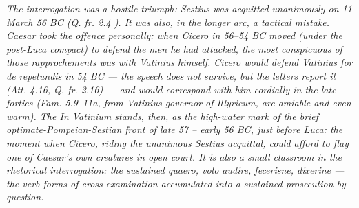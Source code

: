 \textit{The interrogation was a hostile triumph: Sestius was
acquitted unanimously on 11 March 56 BC (Q. fr. 2.4
). It was also, in the longer arc, a tactical
mistake. Caesar took the offence personally: when Cicero in
56--54 BC moved (under the post-Luca compact) to defend the
men he had attacked, the most conspicuous of those rapprochements
was with Vatinius himself. Cicero would defend Vatinius for
\textit{de repetundis} in 54 BC --- the speech does not survive,
but the letters report it (Att. 4.16, Q. fr. 2.16) ---
and would correspond with him cordially in the late forties
(Fam. 5.9--11a, from Vatinius governor of Illyricum, are
amiable and even warm). The \textit{In Vatinium} stands, then,
as the high-water mark of the brief optimate-Pompeian-Sestian
front of late 57 -- early 56 BC, just before Luca: the moment
when Cicero, riding the unanimous Sestius acquittal, could
afford to flay one of Caesar's own creatures in open court. It
is also a small classroom in the rhetorical interrogation: the
sustained \textit{quaero, volo audire, fecerisne, dixerine} ---
the verb forms of cross-examination accumulated into a sustained
prosecution-by-question.}
